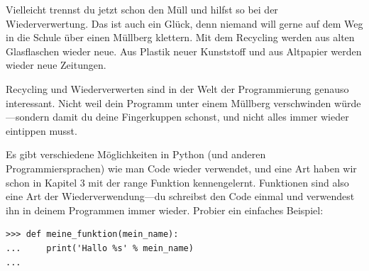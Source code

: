 Vielleicht trennst du jetzt schon den Müll und hilfst so bei der Wiederverwertung. Das ist auch ein Glück, denn niemand will gerne auf dem Weg in die Schule über einen Müllberg klettern. Mit dem Recycling werden aus alten Glasflaschen wieder neue. Aus Plastik neuer Kunststoff und aus Altpapier werden wieder neue Zeitungen.

Recycling und Wiederverwerten sind in der Welt der Programmierung genauso interessant. Nicht weil dein Programm unter einem Müllberg verschwinden würde---sondern damit du deine Fingerkuppen schonst, und nicht alles immer wieder eintippen musst.

Es gibt verschiedene Möglichkeiten in Python (und anderen Programmiersprachen) wie man Code wieder verwendet, und eine Art haben wir schon in Kapitel 3 mit der range Funktion kennengelernt. Funktionen sind also eine Art der Wiederverwendung---du schreibst den Code einmal und verwendest ihn in deinem Programmen immer wieder. Probier ein einfaches Beispiel:

\begin{Verbatim}[frame=single]
>>> def meine_funktion(mein_name):
...     print('Hallo %s' % mein_name)
...
\end{Verbatim}


